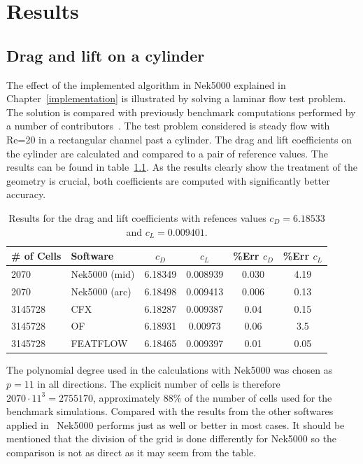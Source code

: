 
\chapter{Results} %

\label{results} %



\section{Drag and lift on a cylinder}
The effect of the implemented algorithm in Nek5000 explained in Chapter~\ref{implementation} is
illustrated by solving a laminar flow test problem. 
The solution is compared with previously benchmark computations performed by a number of 
contributors~\cite{benchmark}. The test problem considered is steady flow with Re=20 in 
a rectangular channel past a cylinder. The drag and lift coefficients on the cylinder 
are calculated and compared to a pair of reference values. The results can be found in 
table~\ref{tab:testcase}. As the results clearly show the treatment of the geometry is 
crucial, both coefficients are computed with significantly better accuracy. 
%
\begin{table}
\centering
\begin{tabular}{l l c c c c}
		\toprule
		\# of Cells & Software & $c_D$ & $c_L$ & \%\textbf{Err} $c_D$ &\%\textbf{Err} $c_L$ \\ \midrule 
		2070 & Nek5000 (mid) & 6.18349 & 0.008939 & 0.030 & 4.19 \\ 
		2070 & Nek5000 (arc) & 6.18498 & 0.009413 & 0.006 & 0.13 \\
		3145728 & CFX 		 & 6.18287 & 0.009387 & 0.04 &0.15 \\
		3145728 & OF	     & 6.18931 & 0.00973 & 0.06 &3.5 \\
		3145728 & FEATFLOW   & 6.18465 & 0.009397 & 0.01 &0.05 \\
		\bottomrule	
	\end{tabular}
	\caption{Results for the drag and lift coefficients with refences values 
	$c_D = 6.18533$ and $c_L = 0.009401$.}
\label{tab:testcase}
\end{table}
%
The polynomial degree used in the calculations with Nek5000 was chosen as $p = 11 $ 
in all directions. The explicit number of cells is therefore $2070\cdot11^{3} = 2755170$,
approximately $88\%$ of the number of cells used for the benchmark simulations. Compared 
with the results from the other softwares applied in~\cite{benchmark} Nek5000 performs 
just as well or better in most cases. It should be mentioned that the division of the grid is done 
differently for Nek5000 so the comparison is not as direct as it may seem from the table.

